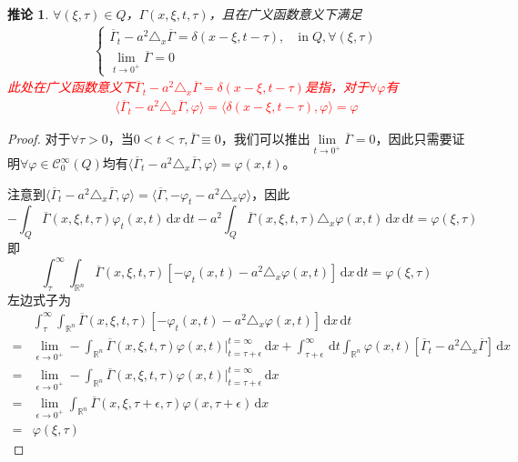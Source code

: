 \documentclass[11pt, a4paper]{article}
\theoremstyle{theorem}
\newtheorem{cor}[thm]{推论}
\newcommand{\intd}[1]{\,\mathrm{d}{#1}}
\begin{document}
\begin{cor}
$\forall (\xi, \tau) \in Q$，$\Gamma(x,\xi,t,\tau)$，且在广义函数意义下满足
\begin{align}
    \begin{cases}
      \overline{\Gamma}_t - a^2 \triangle_x \overline{\Gamma} = \delta(x-\xi, t - \tau),\quad \text{in} \; Q, \forall (\xi,\tau)\\
      \lim\limits_{t \rightarrow 0^+} \overline{\Gamma} = 0
    \end{cases}
\end{align}
\textcolor{red}{此处在广义函数意义下$\overline{\Gamma}_t - a^2 \triangle_x \overline{\Gamma} = \delta(x-\xi, t - \tau)$是指，对于$\forall \varphi$有
\begin{align}
    \langle \overline{\Gamma}_t - a^2 \triangle_x \overline{\Gamma}, \varphi \rangle = \langle \delta(x - \xi, t - \tau), \varphi \rangle = \varphi
\end{align}
}
\end{cor}
\begin{proof}
对于$\forall \tau > 0$，当$0<t<\tau, \overline{\Gamma} \equiv 0$，我们可以推出$\lim\limits_{t \rightarrow 0^+} \overline{\Gamma} = 0$，因此只需要证明$\forall \varphi \in \mathcal{C}_0^\infty(Q)$均有$\langle \overline{\Gamma}_t - a^2 \triangle_x \overline{\Gamma}, \varphi \rangle = \varphi(x,t)$。

注意到$\langle \overline{\Gamma}_t - a^2 \triangle_x \overline{\Gamma}, \varphi \rangle = \langle \overline{\Gamma}, - \varphi_t - a^2 \triangle_x \varphi \rangle$，因此
$$
-\int_Q \overline{\Gamma}(x,\xi,t,\tau) \varphi_t(x,t) \intd x \intd t - a^2 \int_Q \overline{\Gamma}(x,\xi,t,\tau) \triangle_x \varphi(x,t) \intd x \intd t = \varphi(\xi,\tau)
$$
即
$$
\int_\tau^\infty \int_{\mathbb{R}^n}  \overline{\Gamma}(x,\xi,t,\tau) \left[- \varphi_t(x,t) - a^2 \triangle_x \varphi(x,t)\right] \intd x \intd t = \varphi(\xi, \tau)
$$
左边式子为
\begin{align*}
  &\int_\tau^\infty \int_{\mathbb{R}^n}  \overline{\Gamma}(x,\xi,t,\tau) \left[- \varphi_t(x,t) - a^2 \triangle_x \varphi(x,t)\right] \intd x \intd t \\
  = &\lim\limits_{\epsilon \rightarrow 0^+} - \int_{\mathbb{R}^n}  \overline{\Gamma}(x,\xi,t,\tau) \varphi(x,t) \bigg|_{t = \tau + \epsilon}^{t = \infty} \intd x + \int_{\tau + \epsilon}^\infty \intd t\int_{\mathbb{R}^n} \varphi(x,t) \left[\overline{\Gamma}_t - a^2 \triangle_x \overline{\Gamma}\right] \intd x \\
  = &\lim\limits_{\epsilon \rightarrow 0^+} - \int_{\mathbb{R}^n}  \overline{\Gamma}(x,\xi,t,\tau) \varphi(x,t) \bigg|_{t = \tau + \epsilon}^{t = \infty} \intd x  \\
  = &\lim\limits_{\epsilon \rightarrow 0^+} \int_{\mathbb{R}^n}  \overline{\Gamma}(x,\xi,\tau+\epsilon,\tau) \varphi(x,\tau+\epsilon) \intd x \\
  = &\varphi(\xi, \tau)
\end{align*}
\end{proof}
\end{document}

